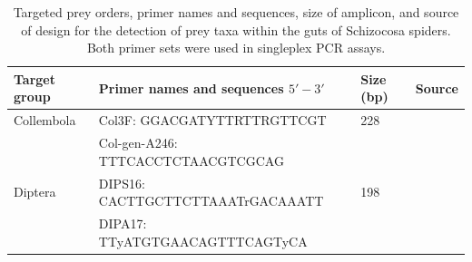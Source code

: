 \documentclass[12pt]{article}
\begin{document}
\begin{table}
  \label{tab:s1}
  \centering
  \begin{tabular}{llll}
    \hline
    \textbf{Target group} & \textbf{Primer names and sequences} $5'-3'$ & \textbf{Size (bp)} & \textbf{Source}\\
    \hline
    Collembola & Col3F: GGACGATYTTRTTRGTTCGT & 228 & \citet{Sint:2012} \\
    & Col-gen-A246: TTTCACCTCTAACGTCGCAG & & \\
    Diptera & DIPS16: CACTTGCTTCTTAAATrGACAAATT & 198 & \citet{Eitzinger:2014} \\
    & DIPA17: TTyATGTGAACAGTTTCAGTyCA &  & \\
  \end{tabular}
  \caption{Targeted prey orders, primer names and sequences, size of amplicon, and source of design for the detection of prey taxa within the guts of Schizocosa spiders.  Both primer sets were used in singleplex PCR assays.}
\end{table}
\end{document}
